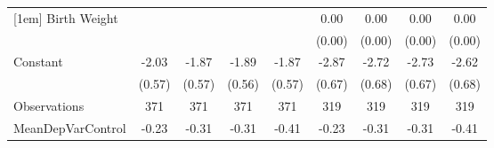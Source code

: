 {\begin{tabular}{l*{8}{c}}
[1em]
Birth Weight        &                     &                     &                     &                     &        0.00\sym{***}&        0.00\sym{***}&        0.00\sym{***}&        0.00\sym{**} \\
                    &                     &                     &                     &                     &      (0.00)         &      (0.00)         &      (0.00)         &      (0.00)         \\
[1em]
Constant            &       -2.03\sym{***}&       -1.87\sym{***}&       -1.89\sym{***}&       -1.87\sym{***}&       -2.87\sym{***}&       -2.72\sym{***}&       -2.73\sym{***}&       -2.62\sym{***}\\
                    &      (0.57)         &      (0.57)         &      (0.56)         &      (0.57)         &      (0.67)         &      (0.68)         &      (0.67)         &      (0.68)         \\
\hline
Observations        &         371         &         371         &         371         &         371         &         319         &         319         &         319         &         319         \\
MeanDepVarControl   &       -0.23         &       -0.31         &       -0.31         &       -0.41         &       -0.23         &       -0.31         &       -0.31         &       -0.41         \\
\hline\hline
\end{tabular}
}
